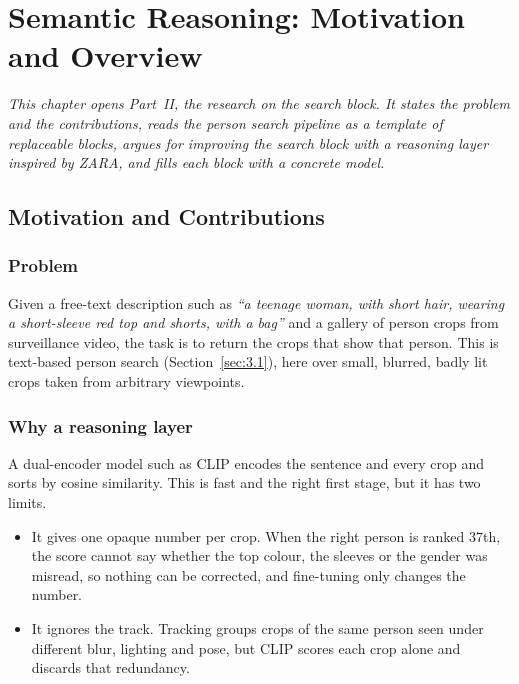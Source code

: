 \chapter{Semantic Reasoning: Motivation and Overview}
\label{chapter:r-overview}

\textit{This chapter opens Part~II, the research on the search block. It states the problem and the contributions, reads the person search pipeline as a template of replaceable blocks, argues for improving the search block with a reasoning layer inspired by ZARA, and fills each block with a concrete model.}

\section{Motivation and Contributions}
\label{sec:r-intro}

\subsection{Problem}
Given a free-text description such as \emph{``a teenage woman, with short hair,
wearing a short-sleeve red top and shorts, with a bag''} and a gallery of person
crops from surveillance video, the task is to return the crops that show that
person. This is text-based person search (Section~\ref{sec:3.1}), here over small,
blurred, badly lit crops taken from arbitrary viewpoints.

\subsection{Why a reasoning layer}
A dual-encoder model such as CLIP encodes the sentence and every crop and sorts by
cosine similarity. This is fast and the right first stage, but it has two limits.

\begin{itemize}
\item It gives one opaque number per crop. When the right person is ranked 37th,
      the score cannot say whether the top colour, the sleeves or the gender was
      misread, so nothing can be corrected, and fine-tuning only changes the number.
\item It ignores the track. Tracking groups crops of the same person seen under
      different blur, lighting and pose, but CLIP scores each crop alone and
      discards that redundancy.
\end{itemize}

